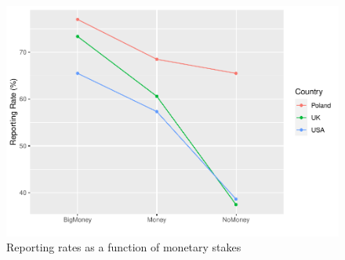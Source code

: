 \documentclass[12pt,halfline,a4paper,]{ouparticle}
\begin{document}
\begin{figure}[p]
\includegraphics[width=1\linewidth]{final-exam-answer-key_files/figure-latex/Figure 2-1} \caption{Reporting rates as a function of monetary stakes}\label{fig:Figure 2-1}
\end{figure}
\end{document}
